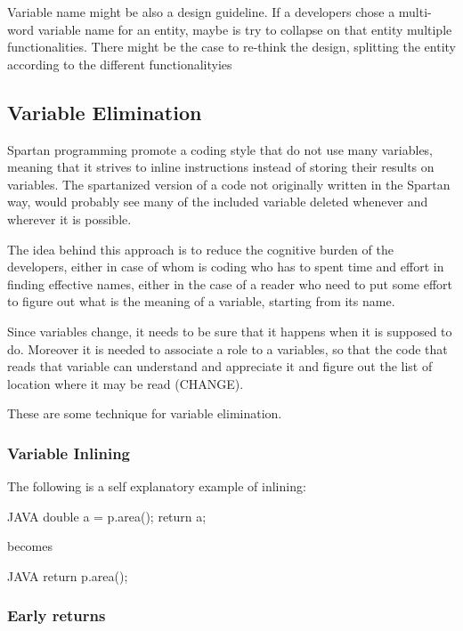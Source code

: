 Variable name might be also a design guideline. If a developers chose a
multi-word variable name for an entity, maybe is try to collapse on that entity
multiple functionalities.  There might be the case to re-think the design,
splitting the entity according to the different functionalityies

\subsection{Variable Elimination}

Spartan programming promote a coding style that do not use many variables,
meaning that it strives to inline instructions instead of storing their results
on variables. The spartanized version of a code not originally written in the
Spartan way, would probably see many of the included variable deleted whenever
and wherever it is possible.

The idea behind this approach is to reduce the cognitive burden of the
developers, either in case of whom is coding who has to spent time and effort
in finding effective names, either in the case of a reader who need to put some
effort to figure out what is the meaning of a variable, starting from its name.

Since variables change, it needs to be sure that it happens when it is supposed
to do. Moreover it is needed to associate a role to a variables, so that the
code that reads that variable can understand and appreciate it and figure out
the list of location where it may be read (CHANGE).

These are some technique for variable elimination.

\subsubsection{Variable Inlining}

The following is a self explanatory example of inlining:

\begin{code}{JAVA}
double a = p.area();
return a;
\end{code}

becomes

\begin{code}{JAVA}
return p.area();
\end{code}

\subsubsection{Early returns}

